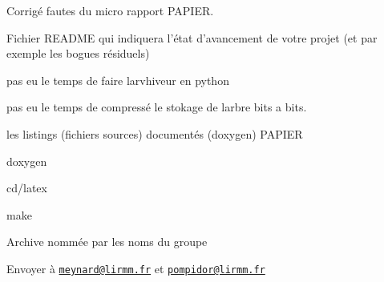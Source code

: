 
\begin{DoxyItemize}
\item Corrigé fautes du micro rapport P\+A\+P\+I\+ER.
\item Fichier R\+E\+A\+D\+ME qui indiquera l’état d’avancement de votre projet (et par exemple les bogues résiduels)
\begin{DoxyItemize}
\item pas eu le temps de faire l\textquotesingle{}arvhiveur en python
\item pas eu le temps de compressé le stokage de l\textquotesingle{}arbre bits a bits.
\end{DoxyItemize}
\item les listings (fichiers sources) documentés (doxygen) P\+A\+P\+I\+ER
\item doxygen
\item cd/latex
\item make
\item Archive nommée par les noms du groupe
\item Envoyer à \href{mailto:meynard@lirmm.fr}{\tt meynard@lirmm.\+fr} et \href{mailto:pompidor@lirmm.fr}{\tt pompidor@lirmm.\+fr}
\end{DoxyItemize}






